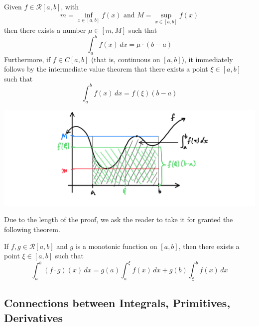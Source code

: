     \begin{theorem}
    Given $f \in \mathcal{R}[a, b]$, with 
    \[m = \inf_{x \in [a, b]} f(x) \text{ and } M = \sup_{x \in [a, b]} f(x)\]
    then there exists a number $\mu \in [m, M]$ such that
    \[\int_a^b f(x)\,dx = \mu \cdot (b - a)\]
    Furthermore, if $f \in C[a, b]$ (that is, continuous on $[a, b]$), it immediately follows by the intermediate value theorem that there exists a point $\xi \in [a, b]$ such that
    \[\int_a^b f(x)\,dx = f(\xi) (b - a)\]
    \begin{center}
        \includegraphics[scale=0.27]{img/Mean_Plus_Intermediate_Value_Theorem_Integral.PNG}
    \end{center}
    \end{theorem}

    Due to the length of the proof, we ask the reader to take it for granted the following theorem. 

    \begin{theorem}
    If $f, g \in \mathcal{R}[a, b]$ and $g$ is a monotonic function on $[a, b]$, then there exists a point $\xi \in [a, b]$ such that
    \[\int_a^b (f \cdot g) (x)\,dx = g(a) \int_a^\xi f(x)\,dx + g(b) \int_\xi^b f(x)\,dx\]
    \end{theorem}

  \subsection{Connections between Integrals, Primitives, Derivatives}

